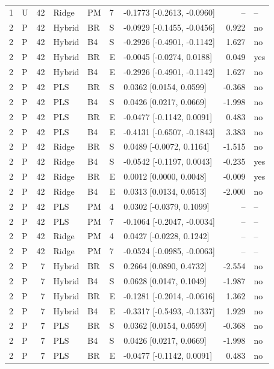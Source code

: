 \documentclass[10pt,a4paper]{article}
\begin{document}
\begin{landscape}
\begin{longtable}{rlrllllrl}
1 & U & 42 & Ridge & PM & 7 & -0.1773 [-0.2613, -0.0960] & -- & -- \\
2 & P & 42 & Hybrid & BR & S & -0.0929 [-0.1455, -0.0456] & 0.922 & no \\
2 & P & 42 & Hybrid & B4 & S & -0.2926 [-0.4901, -0.1142] & 1.627 & no \\
2 & P & 42 & Hybrid & BR & E & -0.0045 [-0.0274, 0.0188] & 0.049 & yes \\
2 & P & 42 & Hybrid & B4 & E & -0.2926 [-0.4901, -0.1142] & 1.627 & no \\
2 & P & 42 & PLS & BR & S & 0.0362 [0.0154, 0.0599] & -0.368 & no \\
2 & P & 42 & PLS & B4 & S & 0.0426 [0.0217, 0.0669] & -1.998 & no \\
2 & P & 42 & PLS & BR & E & -0.0477 [-0.1142, 0.0091] & 0.483 & no \\
2 & P & 42 & PLS & B4 & E & -0.4131 [-0.6507, -0.1843] & 3.383 & no \\
2 & P & 42 & Ridge & BR & S & 0.0489 [-0.0072, 0.1164] & -1.515 & no \\
2 & P & 42 & Ridge & B4 & S & -0.0542 [-0.1197, 0.0043] & -0.235 & yes \\
2 & P & 42 & Ridge & BR & E & 0.0012 [0.0000, 0.0048] & -0.009 & yes \\
2 & P & 42 & Ridge & B4 & E & 0.0313 [0.0134, 0.0513] & -2.000 & no \\
2 & P & 42 & PLS & PM & 4 & 0.0302 [-0.0379, 0.1099] & -- & -- \\
2 & P & 42 & PLS & PM & 7 & -0.1064 [-0.2047, -0.0034] & -- & -- \\
2 & P & 42 & Ridge & PM & 4 & 0.0427 [-0.0228, 0.1242] & -- & -- \\
2 & P & 42 & Ridge & PM & 7 & -0.0524 [-0.0985, -0.0063] & -- & -- \\
2 & P & 7 & Hybrid & BR & S & 0.2664 [0.0890, 0.4732] & -2.554 & no \\
2 & P & 7 & Hybrid & B4 & S & 0.0628 [0.0147, 0.1049] & -1.987 & no \\
2 & P & 7 & Hybrid & BR & E & -0.1281 [-0.2014, -0.0616] & 1.362 & no \\
2 & P & 7 & Hybrid & B4 & E & -0.3317 [-0.5493, -0.1337] & 1.929 & no \\
2 & P & 7 & PLS & BR & S & 0.0362 [0.0154, 0.0599] & -0.368 & no \\
2 & P & 7 & PLS & B4 & S & 0.0426 [0.0217, 0.0669] & -1.998 & no \\
2 & P & 7 & PLS & BR & E & -0.0477 [-0.1142, 0.0091] & 0.483 & no \\

\end{longtable}
\end{landscape}
\end{document}
